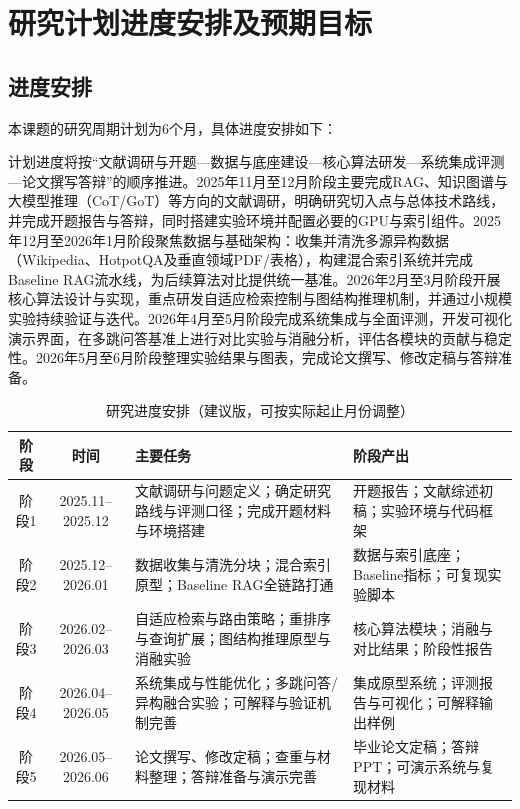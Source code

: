 \section{研究计划进度安排及预期目标}

\subsection{进度安排}
本课题的研究周期计划为6个月，具体进度安排如下：

计划进度将按“文献调研与开题—数据与底座建设—核心算法研发—系统集成评测—论文撰写答辩”的顺序推进。2025年11月至12月阶段主要完成RAG、知识图谱与大模型推理（CoT/GoT）等方向的文献调研，明确研究切入点与总体技术路线，并完成开题报告与答辩，同时搭建实验环境并配置必要的GPU与索引组件。2025年12月至2026年1月阶段聚焦数据与基础架构：收集并清洗多源异构数据（Wikipedia、HotpotQA及垂直领域PDF/表格），构建混合索引系统并完成Baseline RAG流水线，为后续算法对比提供统一基准。2026年2月至3月阶段开展核心算法设计与实现，重点研发自适应检索控制与图结构推理机制，并通过小规模实验持续验证与迭代。2026年4月至5月阶段完成系统集成与全面评测，开发可视化演示界面，在多跳问答基准上进行对比实验与消融分析，评估各模块的贡献与稳定性。2026年5月至6月阶段整理实验结果与图表，完成论文撰写、修改定稿与答辩准备。

\begin{table}[ht]
\centering
\caption{研究进度安排（建议版，可按实际起止月份调整）}
\label{tab:proposal_schedule}
\small
\setlength{\tabcolsep}{0.6em}
\begin{tabularx}{\linewidth}{|c|c|X|X|}
\hline
\textbf{阶段} & \textbf{时间} & \textbf{主要任务} & \textbf{阶段产出} \\
\hline
阶段1 & 2025.11--2025.12 & 文献调研与问题定义；确定研究路线与评测口径；完成开题材料与环境搭建 & 开题报告；文献综述初稿；实验环境与代码框架 \\
\hline
阶段2 & 2025.12--2026.01 & 数据收集与清洗分块；混合索引原型；Baseline RAG全链路打通 & 数据与索引底座；Baseline指标；可复现实验脚本 \\
\hline
阶段3 & 2026.02--2026.03 & 自适应检索与路由策略；重排序与查询扩展；图结构推理原型与消融实验 & 核心算法模块；消融与对比结果；阶段性报告 \\
\hline
阶段4 & 2026.04--2026.05 & 系统集成与性能优化；多跳问答/异构融合实验；可解释与验证机制完善 & 集成原型系统；评测报告与可视化；可解释输出样例 \\
\hline
阶段5 & 2026.05--2026.06 & 论文撰写、修改定稿；查重与材料整理；答辩准备与演示完善 & 毕业论文定稿；答辩PPT；可演示系统与复现材料 \\
\hline
\end{tabularx}
\end{table}

